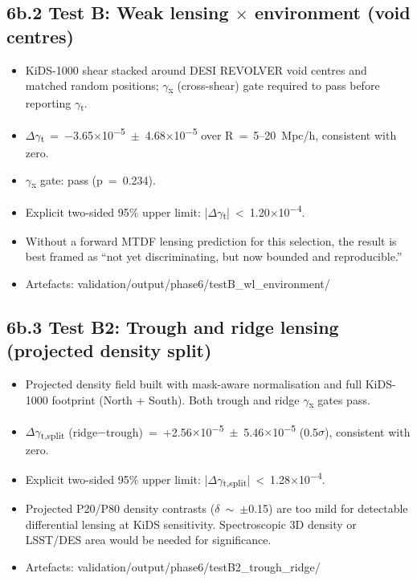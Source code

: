 \documentclass[11pt,a4paper]{article}
\begin{document}
\subsection{6b.2 Test B: Weak lensing $\times$ environment (void centres)}
\begin{itemize}
  \item KiDS-1000 shear stacked around DESI REVOLVER void centres and matched random positions; $\gamma$\textsubscript{x} (cross-shear) gate required to pass before reporting $\gamma$\textsubscript{t}.
  \item $\Delta$$\gamma$\textsubscript{t}~=~$-$3.65$\times$10\textsuperscript{$-$5}~$\pm$~4.68$\times$10\textsuperscript{$-$5} over R~=~5--20~Mpc/\allowbreak{}h, consistent with zero.
  \item $\gamma$\textsubscript{x} gate: pass (p~=~0.234).
  \item Explicit two-sided 95\% upper limit: |$\Delta$$\gamma$\textsubscript{t}|~<~1.20$\times$10\textsuperscript{$-$4}.
  \item Without a forward MTDF lensing prediction for this selection, the result is best framed as ``not yet discriminating, but now bounded and reproducible.''
  \item Artefacts: validation/\allowbreak{}output/\allowbreak{}phase6/\allowbreak{}testB\_\allowbreak{}wl\_\allowbreak{}environment/\allowbreak{}
\end{itemize}

\subsection{6b.3 Test B2: Trough and ridge lensing (projected density split)}
\begin{itemize}
  \item Projected density field built with mask-aware normalisation and full KiDS-1000 footprint (North + South). Both trough and ridge $\gamma$\textsubscript{x} gates pass.
  \item $\Delta$$\gamma$\textsubscript{t,split} (ridge$-$trough)~=~+2.56$\times$10\textsuperscript{$-$5}~$\pm$~5.46$\times$10\textsuperscript{$-$5} (0.5$\sigma$), consistent with zero.
  \item Explicit two-sided 95\% upper limit: |$\Delta$$\gamma$\textsubscript{t,split}|~<~1.28$\times$10\textsuperscript{$-$4}.
  \item Projected P20/\allowbreak{}P80 density contrasts ($\delta$~$\sim$~$\pm$0.15) are too mild for detectable differential lensing at KiDS sensitivity. Spectroscopic 3D density or LSST/\allowbreak{}DES area would be needed for significance.
  \item Artefacts: validation/\allowbreak{}output/\allowbreak{}phase6/\allowbreak{}testB2\_\allowbreak{}trough\_\allowbreak{}ridge/\allowbreak{}
\end{itemize}
\end{document}
